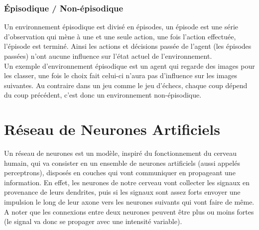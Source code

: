 \documentclass{article}
\begin{document}
\subsubsection{Épisodique / Non-épisodique}

Un environnement épisodique est divisé en épisodes, un épisode est une série d'observation qui mène à une et une seule action, une fois l'action effectuée, l'épisode est terminé. Ainsi les actions et décisions passée de l'agent (les épisodes passées) n'ont aucune influence sur l'état actuel de l'environnement.\\
Un exemple d'environnement épisodique est un agent qui regarde des images pour les classer, une fois le choix fait celui-ci n'aura pas d'influence sur les images suivantes. Au contraire dans un jeu comme le jeu d'échecs, chaque coup dépend du coup précédent, c'est donc un environnement non-épisodique\cite{tutoptai}.

\newpage
\section{Réseau de Neurones Artificiels}

Un réseau de neurones est un modèle, inspiré du fonctionnement du cerveau humain, qui va consister en un ensemble de neurones artificiels (aussi appelés perceptrons), disposés en couches qui vont communiquer en propageant une information\cite{wikiann}. En effet, les neurones de notre cerveau vont collecter les signaux en provenance de leurs dendrites, puis si les signaux sont assez forts envoyer une impulsion le long de leur axone vers les neurones suivants qui vont faire de même. A noter que les connexions entre deux neurones peuvent être plus ou moins fortes (le signal va donc se propager avec une intensité variable)\cite{neuronswork}.
\end{document}
